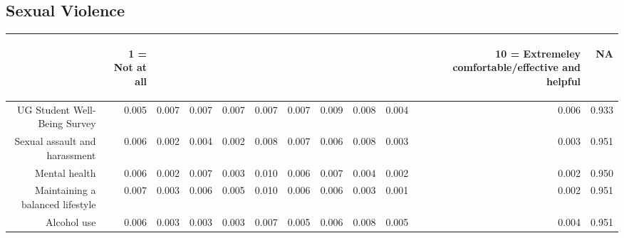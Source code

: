 \documentclass{article}\usepackage[]{graphicx}\usepackage[]{color}
\makeatletter
\newenvironment{kframe}{%
 \def\at@end@of@kframe{}%
 \ifinner\ifhmode%
  \def\at@end@of@kframe{\end{minipage}}%
  \begin{minipage}{\columnwidth}%
 \fi\fi%
 \def\FrameCommand##1{\hskip\@totalleftmargin \hskip-\fboxsep
 \colorbox{shadecolor}{##1}\hskip-\fboxsep
     \hskip-\linewidth \hskip-\@totalleftmargin \hskip\columnwidth}%
 \MakeFramed {\advance\hsize-\width
   \@totalleftmargin\z@ \linewidth\hsize
   \@setminipage}}%
 {\par\unskip\endMakeFramed%
 \at@end@of@kframe}
\makeatother
\begin{document}
\subsection{Sexual Violence}
\begin{kframe}


{\ttfamily\noindent\bfseries{}}\end{kframe}%
\begin{table}[ht]
\centering
\begin{tabular}{rrrrrrrrrrrr}
  \hline
 & \begin{sideways} 1 = Not at all \end{sideways} & \begin{sideways}   \end{sideways} & \begin{sideways}   \end{sideways} & \begin{sideways}   \end{sideways} & \begin{sideways}   \end{sideways} & \begin{sideways}   \end{sideways} & \begin{sideways}   \end{sideways} & \begin{sideways}   \end{sideways} & \begin{sideways}   \end{sideways} & \begin{sideways} 10 = Extremeley comfortable/effective and helpful \end{sideways} & \begin{sideways} NA \end{sideways} \\ 
  \hline
UG Student Well-Being Survey & 0.005 & 0.007 & 0.007 & 0.007 & 0.007 & 0.007 & 0.009 & 0.008 & 0.004 & 0.006 & 0.933 \\ 
  Sexual assault and harassment & 0.006 & 0.002 & 0.004 & 0.002 & 0.008 & 0.007 & 0.006 & 0.008 & 0.003 & 0.003 & 0.951 \\ 
  Mental health & 0.006 & 0.002 & 0.007 & 0.003 & 0.010 & 0.006 & 0.007 & 0.004 & 0.002 & 0.002 & 0.950 \\ 
  Maintaining a balanced lifestyle & 0.007 & 0.003 & 0.006 & 0.005 & 0.010 & 0.006 & 0.006 & 0.003 & 0.001 & 0.002 & 0.951 \\ 
  Alcohol use & 0.006 & 0.003 & 0.003 & 0.003 & 0.007 & 0.005 & 0.006 & 0.008 & 0.005 & 0.004 & 0.951 \\ 
   \hline
\end{tabular}
\end{table}
\end{document}
